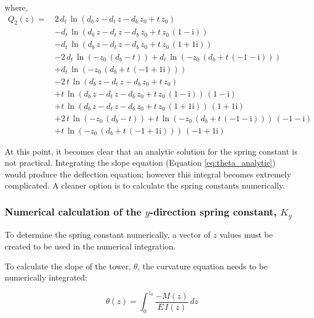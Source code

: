 where,
\begin{align*}
	Q_2(z) =\, &2\,d_{t}\,\ln\left(d_{b}\,z-d_{t}\,z-d_{b}\,z_{0}+t\,z_{0}\right) \\
	&-d_{t}\,\ln\left(d_{b}\,z-d_{t}\,z-d_{b}\,z_{0}+t\,z_{0}\,\left(1-\mathrm{i}\right)\right) \\
	&-d_{t}\,\ln\left(d_{b}\,z-d_{t}\,z-d_{b}\,z_{0}+t\,z_{0}\,\left(1+1{}\mathrm{i}\right)\right) \\
	&-2\,d_{t}\,\ln\left(-z_{0}\,\left(d_{b}-t\right)\right)+d_{t}\,\ln\left(-z_{0}\,\left(d_{b}+t\,\left(-1-\mathrm{i}\right)\right)\right) \\
	&+d_{t}\,\ln\left(-z_{0}\,\left(d_{b}+t\,\left(-1+1{}\mathrm{i}\right)\right)\right) \\
	&-2\,t\,\ln\left(d_{b}\,z-d_{t}\,z-d_{b}\,z_{0}+t\,z_{0}\right) \\
	&+t\,\ln\left(d_{b}\,z-d_{t}\,z-d_{b}\,z_{0}+t\,z_{0}\,\left(1-\mathrm{i}\right)\right)\,\left(1-\mathrm{i}\right) \\
	&+t\,\ln\left(d_{b}\,z-d_{t}\,z-d_{b}\,z_{0}+t\,z_{0}\,\left(1+1{}\mathrm{i}\right)\right)\,\left(1+1{}\mathrm{i}\right) \\
	&+2\,t\,\ln\left(-z_{0}\,\left(d_{b}-t\right)\right)+t\,\ln\left(-z_{0}\,\left(d_{b}+t\,\left(-1-\mathrm{i}\right)\right)\right)\,\left(-1-\mathrm{i}\right) \\
	&+t\,\ln\left(-z_{0}\,\left(d_{b}+t\,\left(-1+1{}\mathrm{i}\right)\right)\right)\,\left(-1+1{}\mathrm{i}\right)
\end{align*}

At this point, it becomes clear that an analytic solution for the spring constant is not practical.  Integrating the slope equation (Equation \ref{eq:theta_analytic}) would produce the deflection equation; however this integral becomes extremely complicated.  A cleaner option is to calculate the spring constants numerically.

\subsubsection{Numerical calculation of the $y$-direction spring constant, $K_y$}
To determine the spring constant numerically, a vector of $z$ values must be created to be used in the numerical integration. 

To calculate the slope of the tower, $\theta$, the curvature equation needs to be numerically integrated:

\begin{equation}
	\theta(z) = \int_0^{z_0}{\frac{-M(z)}{E\,I(z)}\,dz}
\end{equation}

